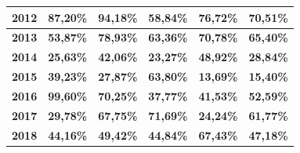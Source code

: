 \begin{table}[ht]
\begin{tabular}{|c|c|c|c|c|c|}
\rowcolor[HTML]{80C397} 
\textbf{2012}                         & \textbf{87,20\%}                                              & \textbf{94,18\%}                                                & \textbf{58,84\%}                                                  & \textbf{76,72\%}                                                     & \textbf{70,51\%}                                                             \\ \hline
\textbf{2013}                         & \textbf{53,87\%}                                              & \textbf{78,93\%}                                                & \textbf{63,36\%}                                                  & \textbf{70,78\%}                                                     & \textbf{65,40\%}                                                             \\ \hline
\rowcolor[HTML]{80C397} 
\textbf{2014}                         & \textbf{25,63\%}                                              & \textbf{42,06\%}                                                & \textbf{23,27\%}                                                  & \textbf{48,92\%}                                                     & \textbf{28,84\%}                                                             \\ \hline
\cellcolor[HTML]{FFFFFF}\textbf{2015} & \textbf{39,23\%}                                              & \textbf{27,87\%}                                                & \textbf{63,80\%}                                                  & \textbf{13,69\%}                                                     & \textbf{15,40\%}                                                             \\ \hline
\rowcolor[HTML]{80C397} 
\textbf{2016}                         & \textbf{99,60\%}                                              & \textbf{70,25\%}                                                & \textbf{37,77\%}                                                  & \textbf{41,53\%}                                                     & \textbf{52,59\%}                                                             \\ \hline
\textbf{2017}                         & \textbf{29,78\%}                                              & \textbf{67,75\%}                                                & \textbf{71,69\%}                                                  & \textbf{24,24\%}                                                     & \textbf{61,77\%}                                                             \\ \hline
\rowcolor[HTML]{80C397} 
\textbf{2018}                         & \textbf{44,16\%}                                              & \textbf{49,42\%}                                                & \textbf{44,84\%}                                                  & \textbf{67,43\%}                                                     & \textbf{47,18\%}                                                             


\end{tabular}
\end{table}
